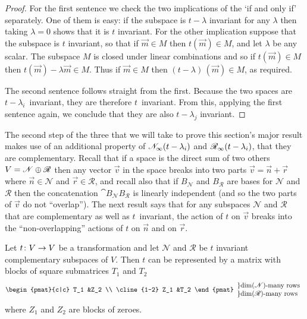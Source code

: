 \begin{proof}
For the first sentence we check the two implications of the
`if and only if' separately.
One of them is easy: if the subspace is $t-\lambda$ invariant for 
any $\lambda$ then taking $\lambda=0$ shows that it is $t$ invariant.
For the other implication suppose that the subspace is $t$ invariant,
so that if $\vec{m}\in M$ then $t(\vec{m})\in M$, and let $\lambda$ be 
any scalar.
The subspace $M$ is closed under linear combinations and so if 
$t(\vec{m})\in M$ then $t(\vec{m})-\lambda\vec{m}\in M$.
Thus if $\vec{m}\in M$ then $(t-\lambda)\,(\vec{m})\in M$, as required.

The second sentence follows straight from the first.
Because the
two spaces are $t-\lambda_i$~invariant, they are 
therefore \( t \)~invariant.
From this, applying the first sentence again, we
conclude that they are also \( t-\lambda_j \) invariant.
\end{proof}

The second step of the three that we will take to prove this
section's major result makes use of an additional property of 
\( \mathscr{N}_\infty(t-\lambda_i) \) and
\( \mathscr{R}_\infty(t-\lambda_i) \), that they are complementary.
Recall that if a space is the direct sum of two others 
\( V=\mathscr{N}\oplus \mathscr{R} \) 
then any vector \( \vec{v} \) in the space breaks into
two parts \( \vec{v}=\vec{n}+\vec{r} \) where \( \vec{n}\in \mathscr{N} \) and
\( \vec{r}\in \mathscr{R} \), and recall also 
that if \( B_{\mathscr{N}} \) and \( B_{\mathscr{R}} \) are bases for
\( \mathscr{N} \) and \( \mathscr{R} \) then the concatenation
\( \cat{B_{\mathscr{N}}}{B_{\mathscr{R}}} \) is linearly independent (and
so the two parts of \( \vec{v} \) do not ``overlap'').
The next result says that for any subspaces
\( \mathscr{N} \) and \( \mathscr{R} \) that are complementary 
as well as \( t \)~invariant,
the action
of \( t \) on \( \vec{v} \) breaks into the ``non-overlapping'' actions of
\( t \) on \( \vec{n} \) and on \( \vec{r} \).

\begin{lemma} \label{le:InvCompSubspSplitTrans}
Let \( \mbox{$t\colon V\to V$} \) be a transformation and let \( \mathscr{N} \) and 
\( \mathscr{R} \) be
\( t \) invariant complementary subspaces of \( V \).
Then \( t \) can be represented by a matrix with
blocks of square submatrices $T_1$ and $T_2$
\begin{equation*}
  \begin{pmat}{c|c}
      T_1   &Z_2  \\  \cline{1-2}
      Z_1 &T_2
   \end{pmat}
   \begin{array}{ll}
     \} \text{$\dim(\mathscr{N})$-many rows}  \\
     \} \text{$\dim(\mathscr{R})$-many rows}
   \end{array}
\end{equation*}
where \( Z_1 \) and \( Z_2 \) are blocks of zeroes.
\end{lemma}

